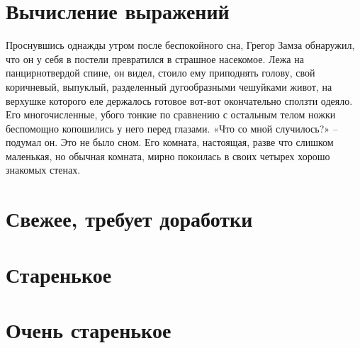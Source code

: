 \chapter{Вычисление выражений}

Проснувшись однажды утром после беспокойного сна, Грегор Замза обнаружил, что
он у себя в постели превратился в страшное насекомое. Лежа на панцирнотвердой
спине, он видел, стоило ему приподнять голову, свой коричневый, выпуклый,
разделенный дугообразными чешуйками живот, на верхушке которого еле держалось
готовое вот-вот окончательно сползти одеяло. Его многочисленные, убого тонкие
по сравнению с остальным телом ножки беспомощно копошились у него перед
глазами. «Что со мной случилось?» – подумал он. Это не было сном. Его комната,
настоящая, разве что слишком маленькая, но обычная комната, мирно покоилась в
своих четырех хорошо знакомых стенах.








\chapter{Свежее, требует доработки} %





\chapter{Старенькое} %







\chapter{Очень старенькое} %









